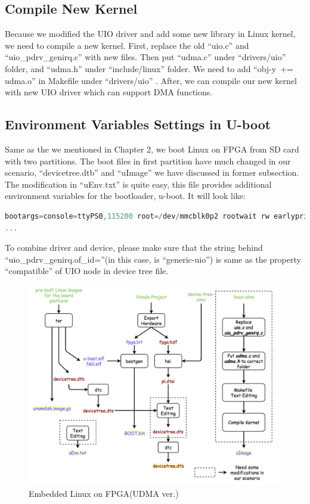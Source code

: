 \subsection{Compile New Kernel}
\label{subsec:Compile New Kernel}
Because we modified the UIO driver and add some new library in Linux kernel, we need to compile a new kernel. First, replace the old ``uio.c'' and ``uio\_pdrv\_genirq.c'' with new files. Then put ``udma.c'' under ``drivers/uio'' folder, and ``udma.h'' under ``include/linux'' folder. We need to add ``obj-y\  += udma.o'' in Makefile under ``drivers/uio'' . After, we can compile our new kernel with new UIO driver which can support DMA functions.

\subsection{Environment Variables Settings in U-boot}
\label{subsec:Linux On FPGA}
Same as the we mentioned in Chapter 2, we boot Linux on FPGA from SD card with two partitions. The boot files in first partition have much changed in our scenario, ``devicetree.dtb'' and ``uImage'' we have discussed in former subsection. The modification in ``uEnv.txt'' is quite easy, this file provides additional environment variables for the bootloader, u-boot. It will look like: 

{\renewcommand\baselinestretch{0.8}\selectfont
\begin{lstlisting}[frame=single,language=C]
bootargs=console=ttyPS0,115200 root=/dev/mmcblk0p2 rootwait rw earlyprintk uio_pdrv_genirq.of_id=genric-uio
...
\end{lstlisting}
\par}
To combine driver and device, please make sure that the string behind ``uio\_pdrv\_genirq.of\_id=''(in this case, is ``generic-uio'') is same as the property ``compatible'' of UIO node in device tree file.

\begin{figure}[!htb]
  \centering
  \includegraphics[scale=0.4]{images/new_embedded_linux.jpg}
  \caption[Embedded Linux on FPGA(UDMA ver.)]{Embedded Linux on FPGA(UDMA ver.)}
  \label{fig:Embedded Linux on FPGA(UDMA ver.)}
\end{figure}

